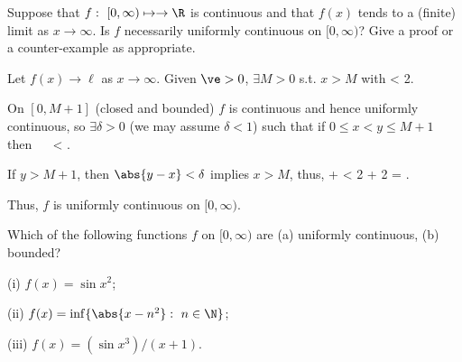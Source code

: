\begin{problem}
Suppose that $f :\ [0,\infty) \mapsto \to \R$ is continuous and that $f(x)$ tends to a (finite) limit as $x \to \infty$. Is $f$ necessarily uniformly continuous on $[0,\infty)$? Give a proof or a counter-example as appropriate.
\end{problem}

\begin{solution}[\bf Solution.]
Let $f(x)\to \ell$ as $x\to \infty$. Given $\ve>0$, $\exists M >0$ s.t. $x > M$ with
\be
{} < \frac{\ve}2.
\ee

On $[0,M+1]$ (closed and bounded) $f$ is continuous and hence uniformly continuous, so $\exists \delta >0$ (we may assume $\delta <1$) such that if $0\leq x<y \leq M+1$ then
\be
{} \ \ra \  < \ve.
\ee

If $y>M+1$, then $\abs{y-x}<\delta$ implies $x > M$, thus,
\be
{} \leq {} +  < \frac{\ve}2 + \frac{\ve}2 = \ve.
\ee

Thus, $f$ is uniformly continuous on $[0,\infty)$.
\end{solution}



\begin{problem}
Which of the following functions $f$ on $[0,\infty)$ are (a) uniformly continuous, (b) bounded?
\ben
\item [(i)] $f(x) = \sin x^2$;
\item [(ii)] $f(x) = \inf\{\abs{x - n^2}:\ n \in \N\}$;
\item [(iii)] $f(x) = (\sin x^3)/(x + 1)$.
\een
\end{problem}

